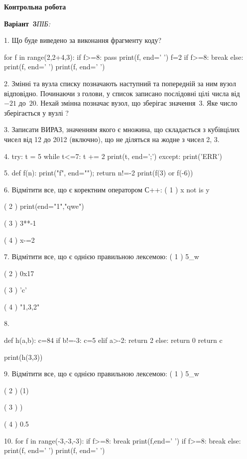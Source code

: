 \documentclass[11pt]{article}
\begin{document}
{\large\textbf{Контрольна робота}}

\textbf{Варіант \No\,3}\hfill \textit{ПІБ:}\,\underline{\hspace{60mm}}
\vspace{4mm}

1. Що буде виведено за виконання фрагменту коду?

for f in range(2,2+4,3):
    if f>=8:
        pass
    print(f, end=' ')
    f=2
    if f>=8:
        break
else:
    print(f, end=' ')
print(f, end=' ')


2. 
Змінні  та  вузла списку позначають наступний та попередній за ним вузол відповідно. Починаючи з голови, у список записано послідовні цілі числа від~$-21$ до~$20$. Нехай змінна  позначає вузол, що зберігає значення~$3$.
Яке число зберігається у вузлі  ?


3. 
Записати ВИРАЗ, значенням якого є множина, що складається з кубівцілих чисел від 12 до 2012 (включно), що не діляться на жодне з чисел 2, 3.

4. 
try:
    t = 5
    while t<=7:
        t += 2
    print(t, end=';')
except:
    print('ERR')


5. 
def f(n): print("f", end=""); return n!=-2
   print(f(3) or f(-6))

6. %
Відмітити все, що є коректним оператором С++:
( 1 ) x not is y

( 2 ) print(end="1","qwe")

( 3 ) 3**-1

( 4 ) x-=2


7. %
Відмітити все, що є однією правильною лексемою:
( 1 ) 5_w

( 2 ) 0x17

( 3 ) 'c'

( 4 ) "1,3,2"


8. 

def h(a,b):
    c=84
    if b!=-3:
        c=5
    elif a>-2:
         return 2
    else: 
        return 0
    return c

print(h(3,3))

9. %
Відмітити все, що є однією правильною лексемою:
( 1 ) 5_w

( 2 ) (1)

( 3 ) )

( 4 ) 0.5


10. 
for f in range(-3,-3,-3):
    if f>=8:
        break
        print(f,end=' ')
    if f>=8:
        break
else:
    print(f, end=' ')
print(f, end=' ')


\newpage
\end{document}
